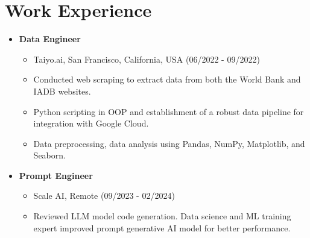 \documentclass{article}
\begin{document}
\section*{Work Experience}
\begin{itemize}[leftmargin=*]
    \item \textbf{Data Engineer}
    \begin{itemize}
        \item Taiyo.ai, San Francisco, California, USA (06/2022 - 09/2022)
        \item Conducted web scraping to extract data from both the World Bank and IADB websites.
        \item Python scripting in OOP and establishment of a robust data pipeline for integration with Google Cloud.
        \item Data preprocessing, data analysis using Pandas, NumPy, Matplotlib, and Seaborn.
    \end{itemize}
    
    \item \textbf{Prompt Engineer}
    \begin{itemize}
        \item Scale AI, Remote (09/2023 - 02/2024)
        \item Reviewed LLM model code generation. Data science and ML training expert improved prompt generative AI model for better performance.
    \end{itemize}
\end{itemize}
\end{document}
